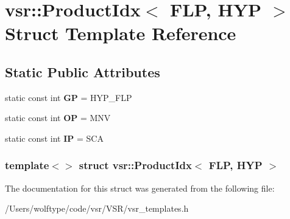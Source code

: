 \hypertarget{structvsr_1_1_product_idx_3_01_f_l_p_00_01_h_y_p_01_4}{\section{vsr\-:\-:Product\-Idx$<$ F\-L\-P, H\-Y\-P $>$ Struct Template Reference}
\label{structvsr_1_1_product_idx_3_01_f_l_p_00_01_h_y_p_01_4}
}
\subsection*{Static Public Attributes}
\begin{DoxyCompactItemize}
\item 
\hypertarget{structvsr_1_1_product_idx_3_01_f_l_p_00_01_h_y_p_01_4_a764b8a5e86e740d4187325fdef2a21d3}{static const int {\bfseries G\-P} = H\-Y\-P\-\_\-\-F\-L\-P}\label{structvsr_1_1_product_idx_3_01_f_l_p_00_01_h_y_p_01_4_a764b8a5e86e740d4187325fdef2a21d3}

\item 
\hypertarget{structvsr_1_1_product_idx_3_01_f_l_p_00_01_h_y_p_01_4_a07b51ab228183ecab9704b160094f551}{static const int {\bfseries O\-P} = M\-N\-V}\label{structvsr_1_1_product_idx_3_01_f_l_p_00_01_h_y_p_01_4_a07b51ab228183ecab9704b160094f551}

\item 
\hypertarget{structvsr_1_1_product_idx_3_01_f_l_p_00_01_h_y_p_01_4_a7048ba7733194acdd379b228668b4878}{static const int {\bfseries I\-P} = S\-C\-A}\label{structvsr_1_1_product_idx_3_01_f_l_p_00_01_h_y_p_01_4_a7048ba7733194acdd379b228668b4878}

\end{DoxyCompactItemize}
\subsubsection*{template$<$$>$ struct vsr\-::\-Product\-Idx$<$ F\-L\-P, H\-Y\-P $>$}



The documentation for this struct was generated from the following file\-:\begin{DoxyCompactItemize}
\item 
/\-Users/wolftype/code/vsr/\-V\-S\-R/vsr\-\_\-templates.\-h\end{DoxyCompactItemize}
